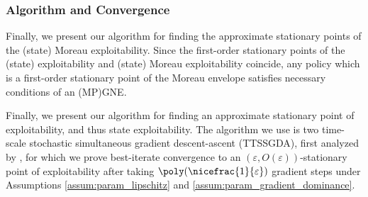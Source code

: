 

\subsubsection{Algorithm and Convergence}

Finally, we present our algorithm for finding the approximate stationary points of the (state) Moreau exploitability. 
Since the first-order stationary points of the (state) exploitability and (state) Moreau exploitability coincide, any policy which is a first-order stationary point of the Moreau envelope satisfies necessary conditions of an (MP)GNE. 
\fi

Finally, we present our algorithm for finding an approximate stationary point of exploitability, and thus state exploitability.
The algorithm we use is two time-scale stochastic simultaneous gradient descent-ascent (TTSSGDA), first analyzed by
\citet{lin2020gradient, daskalakis2020independent}, for which we prove best-iterate convergence to an $(\varepsilon, O(\varepsilon))$-stationary point of exploitability after taking $\poly(\nicefrac{1}{\varepsilon})$ gradient steps 
under Assumptions \ref{assum:param_lipschitz} and \ref{assum:param_gradient_dominance}.





    
